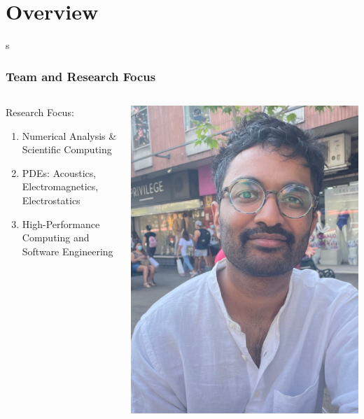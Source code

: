 \section{Overview}
s
\begin{frame}
    \frametitle{Team and Research Focus}
    \begin{columns}
        
        \begin{column}{0.5\textwidth}
 
        Research Focus:

            \begin{enumerate}
                \item Numerical Analysis \& Scientific Computing
                \item PDEs: Acoustics, Electromagnetics, Electrostatics
                \item High-Performance Computing and Software Engineering
            \end{enumerate}
        \end{column}
        \begin{column}{0.5\textwidth}
             \begin{center}
                 \begin{minipage}{0.48\linewidth}
                    \includegraphics[width=0.9\linewidth]{assets/sri.jpeg}

\end{minipage}
\end{center}
\end{column}
\end{columns}
\end{frame}
